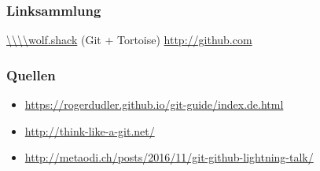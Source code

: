 \documentclass{beamer}
\begin{document}
\begin{frame}
\frametitle{Linksammlung}
\url{\\\\wolf.shack} (Git + Tortoise)
\url{http://github.com}
\end{frame}

\begin{frame}
\frametitle{Quellen}

\begin{itemize}
    \item[] \url{https://rogerdudler.github.io/git-guide/index.de.html}
    \item[] \url{http://think-like-a-git.net/}
    \item[] \url{http://metaodi.ch/posts/2016/11/git-github-lightning-talk/}
\end{itemize}


\end{frame}
\end{document}

